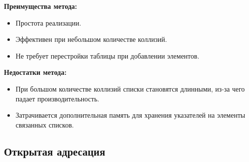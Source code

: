 \begin{minipage}[t]{0.45\textwidth}
	\textbf{Преимущества метода:}
	\begin{itemize}[label=$\triangleright$, leftmargin=*, font=\scriptsize, noitemsep, topsep=0pt, , partopsep=0pt]
		\item {\footnotesize Простота реализации.}
		\item {\footnotesize Эффективен при небольшом количестве коллизий.}
		\item {\footnotesize Не требует перестройки таблицы при добавлении элементов.}
	\end{itemize}
\end{minipage}
\hspace{1cm}
\begin{minipage}[t]{0.45\textwidth}
	\textbf{Недостатки метода:}
	\begin{itemize}[label=$\triangleright$, leftmargin=*, font=\scriptsize, noitemsep, topsep=0pt, , partopsep=0pt]
		\item {\footnotesize При большом количестве коллизий списки становятся длинными, из-за чего падает производительность.}
		\item {\footnotesize Затрачивается дополнительная память для хранения указателей на элементы связанных списков.}
	\end{itemize}
\end{minipage}

\subsection{Открытая адресация} \label{sec:open_addressing}

